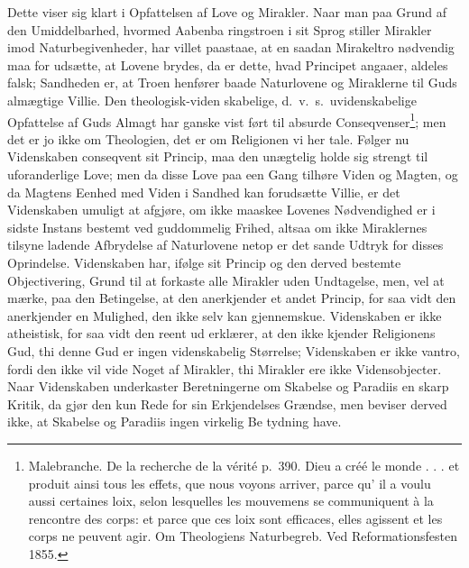 \documentclass[12pt,a4paper]{article}
\newcommand{\opage}[1]{\marginnote{\footnotesize\textit{[#1]}}}
\begin{document}
Dette viser sig klart i Opfattelsen af Love og Mirakler.
Naar man paa Grund af den Umiddelbarhed, hvormed Aabenba\-%
ringstroen i sit Sprog stiller Mirakler imod Naturbegivenheder,
har villet paastaae, at en saadan Mirakeltro nødvendig maa for\-%
udsætte, at Lovene brydes, da er dette, hvad Principet angaaer,
aldeles falsk; Sandheden er, at Troen henfører baade Naturlovene
og Miraklerne til Guds almægtige Villie. Den theologisk-viden\-%
skabelige, d.\ v.\ s.\ uvidenskabelige Opfattelse af Guds Almagt har
ganske vist ført til absurde Conseqvenser\footnote{Malebranche. De la recherche de la vérité p.\ 390. Dieu a créé le
monde . . . et produit ainsi tous les effets, que nous voyons arriver,
parce qu’ il a voulu aussi certaines loix, selon lesquelles les mouvemens
se communiquent à la rencontre des corps: et parce que ces loix sont
efficaces, elles agissent et les corps ne peuvent agir. Om Theologiens
Naturbegreb. Ved Reformationsfesten 1855.}; %
men det er jo ikke
\opage{45}om Theologien, det er om Religionen vi her tale. Følger nu
Videnskaben conseqvent sit Princip, maa den unægtelig holde sig
strengt til uforanderlige Love; men da disse Love paa een Gang
tilhøre Viden og Magten, og da Magtens Eenhed med Viden i
Sandhed kan forudsætte Villie, er det Videnskaben umuligt at afgjøre,
om ikke maaskee Lovenes Nødvendighed er i sidste Instans bestemt
ved guddommelig Frihed, altsaa om ikke Miraklernes tilsyne\-%
ladende Afbrydelse af Naturlovene netop er det sande Udtryk for
disses Oprindelse. Videnskaben har, ifølge sit Princip og den
derved bestemte Objectivering, Grund til at forkaste alle Mirakler
uden Undtagelse, men, vel at mærke, paa den Betingelse, at den
anerkjender et andet Princip, for saa vidt den anerkjender en
Mulighed, den ikke selv kan gjennemskue. Videnskaben er ikke
atheistisk, for saa vidt den reent ud erklærer, at den ikke kjender
Religionens Gud, thi denne Gud er ingen videnskabelig Størrelse;
Videnskaben er ikke vantro, fordi den ikke vil vide Noget af
Mirakler, thi Mirakler ere ikke Vidensobjecter. Naar Videnskaben
underkaster Beretningerne om Skabelse og Paradiis en skarp
Kritik, da gjør den kun Rede for sin Erkjendelses Grændse, men
beviser derved ikke, at Skabelse og Paradiis ingen virkelig Be\-%
tydning have.
\end{document}
